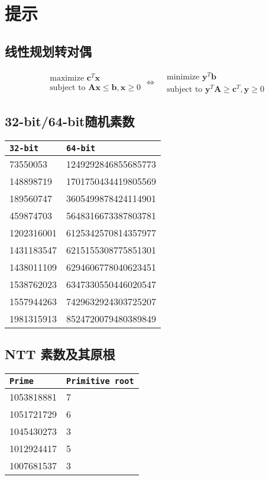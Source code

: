 \chapter{提示}

\section{线性规划转对偶}

\begin{equation*}
\begin{aligned}
&\text{maximize }\mathbf{c}^{T}\mathbf{x}\\
&\text{subject to }\mathbf{A}\mathbf{x} \leq \mathbf{b}, \mathbf{x} \geq 0
\end{aligned}
\Longleftrightarrow
\begin{aligned}
&\text{minimize }\mathbf{y}^{T}\mathbf{b}\\
&\text{subject to }\mathbf{y}^{T}\mathbf{A} \geq \mathbf{c}^{T}, \mathbf{y} \geq 0
\end{aligned}
\end{equation*}

\section{32-bit/64-bit随机素数}
\begin{tabular}{|l|l|}
\hline
\texttt{32-bit} & \texttt{64-bit} \\
\hline
73550053 & 1249292846855685773 \\
\hline
148898719 & 1701750434419805569 \\
\hline
189560747 & 3605499878424114901 \\
\hline
459874703 & 5648316673387803781 \\
\hline
1202316001 & 6125342570814357977 \\
\hline
1431183547 & 6215155308775851301 \\
\hline
1438011109 & 6294606778040623451 \\
\hline
1538762023 & 6347330550446020547 \\
\hline
1557944263 & 7429632924303725207 \\
\hline
1981315913 & 8524720079480389849 \\
\hline
\end{tabular}

\section{NTT 素数及其原根}
\begin{tabular}{|l|l|}
\hline
\texttt{Prime} & \texttt{Primitive root} \\
\hline
1053818881 & 7 \\
\hline
1051721729 & 6 \\
\hline
1045430273 & 3 \\
\hline
1012924417 & 5 \\
\hline
1007681537 & 3 \\
\hline
\end{tabular}
